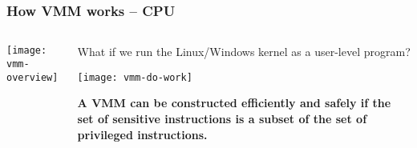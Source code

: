 \begin{frame}[plain]
	\frametitle{How VMM works  -- CPU}
	
	
	
	\begin{columns}
		
		\begin{column}{.25\textwidth}
			
			\texttt{[image: vmm-overview]}
			
		\end{column}
		
		\begin{column}{.75\textwidth}
			
			What if we run the Linux/Windows kernel as a user-level program?	
			
			\centering
			\texttt{[image: vmm-do-work]}	
			\begin{flushleft}
				\textbf{A VMM can be constructed efficiently and safely if the set of sensitive instructions is a subset of the set of privileged instructions.}
			\end{flushleft}
%				
			
		\end{column}
		
		
	\end{columns}
	
	
\end{frame}



